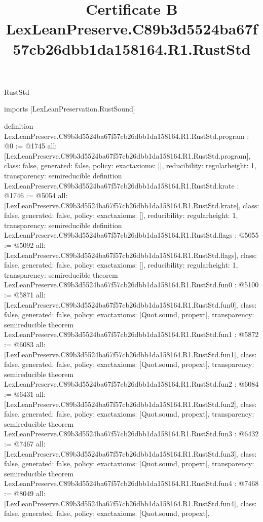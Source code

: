 \begin{lexlean}{RustStd}
\title{Certificate B LexLeanPreserve.C89b3d5524ba67f57cb26dbb1da158164.R1.RustStd}
\begin{coremodule}
imports [LexLeanPreservation.RustSound]

definition LexLeanPreserve.C89b3d5524ba67f57cb26dbb1da158164.R1.RustStd.program : @0 := @1745 {
  all: [LexLeanPreserve.C89b3d5524ba67f57cb26dbb1da158164.R1.RustStd.program],
  class: false,
  generated: false,
  policy: exact{axioms: []},
  reducibility: regular{height: 1},
  transparency: semireducible
}
definition LexLeanPreserve.C89b3d5524ba67f57cb26dbb1da158164.R1.RustStd.krate : @1746 := @5054 {
  all: [LexLeanPreserve.C89b3d5524ba67f57cb26dbb1da158164.R1.RustStd.krate],
  class: false,
  generated: false,
  policy: exact{axioms: []},
  reducibility: regular{height: 1},
  transparency: semireducible
}
definition LexLeanPreserve.C89b3d5524ba67f57cb26dbb1da158164.R1.RustStd.flags : @5055 := @5092 {
  all: [LexLeanPreserve.C89b3d5524ba67f57cb26dbb1da158164.R1.RustStd.flags],
  class: false,
  generated: false,
  policy: exact{axioms: []},
  reducibility: regular{height: 1},
  transparency: semireducible
}
theorem LexLeanPreserve.C89b3d5524ba67f57cb26dbb1da158164.R1.RustStd.fun0 : @5100 := @5871 {
  all: [LexLeanPreserve.C89b3d5524ba67f57cb26dbb1da158164.R1.RustStd.fun0],
  class: false,
  generated: false,
  policy: exact{axioms: [Quot.sound, propext]},
  transparency: semireducible
}
theorem LexLeanPreserve.C89b3d5524ba67f57cb26dbb1da158164.R1.RustStd.fun1 : @5872 := @6083 {
  all: [LexLeanPreserve.C89b3d5524ba67f57cb26dbb1da158164.R1.RustStd.fun1],
  class: false,
  generated: false,
  policy: exact{axioms: [Quot.sound, propext]},
  transparency: semireducible
}
theorem LexLeanPreserve.C89b3d5524ba67f57cb26dbb1da158164.R1.RustStd.fun2 : @6084 := @6431 {
  all: [LexLeanPreserve.C89b3d5524ba67f57cb26dbb1da158164.R1.RustStd.fun2],
  class: false,
  generated: false,
  policy: exact{axioms: [Quot.sound, propext]},
  transparency: semireducible
}
theorem LexLeanPreserve.C89b3d5524ba67f57cb26dbb1da158164.R1.RustStd.fun3 : @6432 := @7467 {
  all: [LexLeanPreserve.C89b3d5524ba67f57cb26dbb1da158164.R1.RustStd.fun3],
  class: false,
  generated: false,
  policy: exact{axioms: [Quot.sound, propext]},
  transparency: semireducible
}
theorem LexLeanPreserve.C89b3d5524ba67f57cb26dbb1da158164.R1.RustStd.fun4 : @7468 := @8049 {
  all: [LexLeanPreserve.C89b3d5524ba67f57cb26dbb1da158164.R1.RustStd.fun4],
  class: false,
  generated: false,
  policy: exact{axioms: [Quot.sound, propext]},
}
\end{coremodule}
\end{lexlean}
